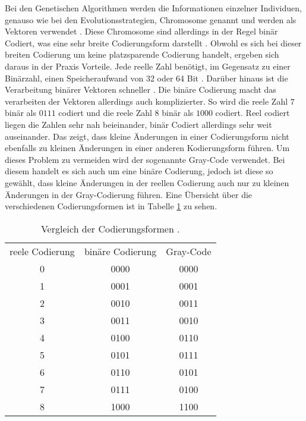 Bei den Genetischen Algorithmen werden die Informationen einzelner Individuen, genauso wie bei den Evolutionsstrategien, Chromosome genannt und werden als Vektoren verwendet \cite[S. 187-189]{schoeneburg}. Diese Chromosome sind allerdings in der Regel binär Codiert, was eine sehr breite Codierungsform darstellt \cite[S. 191]{schoeneburg}. 
Obwohl es sich bei dieser breiten Codierung um keine platzsparende Codierung handelt, ergeben sich daraus in der Praxis Vorteile. Jede reelle Zahl benötigt, im Gegensatz zu einer Binärzahl, einen Speicheraufwand von 32 oder 64 Bit \cite[S. 191]{schoeneburg}.
Darüber hinaus ist die Verarbeitung binärer Vektoren schneller \cite[S. 191]{schoeneburg}. Die binäre Codierung macht das verarbeiten der Vektoren allerdings auch komplizierter.
So wird die reele Zahl $7$ binär als $0111$ codiert und die reele Zahl $8$ binär als $1000$ codiert. Reel codiert liegen die Zahlen sehr nah beieinander, binär Codiert allerdings sehr weit auseinander. Das zeigt, dass kleine Änderungen in einer Codierungsform nicht ebenfalls zu kleinen Änderungen in einer anderen Kodierungsform führen.
Um dieses Problem zu vermeiden wird der sogenannte Gray-Code verwendet. Bei diesem handelt es sich auch um eine binäre Codierung, jedoch ist diese so gewählt, dass kleine Änderungen in der reellen Codierung auch nur zu kleinen Änderungen in der Gray-Codierung führen. Eine Übersicht über die verschiedenen Codierungsformen ist in Tabelle \ref{tab:codierung} zu sehen.
\begin{table}[!htb]
\centering
\begin{tabular}[h]{c|c|c}
reele Codierung & binäre Codierung & Gray-Code \\
0 & 0000 & 0000 \\
1 & 0001 & 0001 \\
2 & 0010 & 0011 \\
3 & 0011 & 0010 \\
4 & 0100 & 0110 \\
5 & 0101 & 0111 \\
6 & 0110 & 0101 \\
7 & 0111 & 0100 \\
8 & 1000 & 1100 \\
\end{tabular}
\caption{\label{tab:codierung}Vergleich der Codierungsformen \cite[S. 192]{schoeneburg}.}
\end{table}

